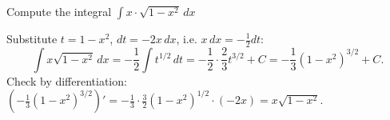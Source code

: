 
\begin{question}
Compute the integral $\displaystyle\int x\cdot\sqrt{1-x^2}\,dx$
\end{question}

\begin{solution}
Substitute $t=1-x^2$, $dt=-2x\,dx$, i.e. $x\,dx=-\frac12dt$:
\[ \int x\sqrt{1-x^2}\,dx=-\frac12\int t^{1/2}\,dt=-\frac12\cdot\frac{2}{3}t^{3/2}+C=\boxed{-\frac13(1-x^2)^{3/2}+C}. \]
Check by differentiation: $\left(-\frac13(1-x^2)^{3/2}\right)'=-\frac13\cdot\frac32(1-x^2)^{1/2}\cdot(-2x)=x\sqrt{1-x^2}$.
\end{solution}
